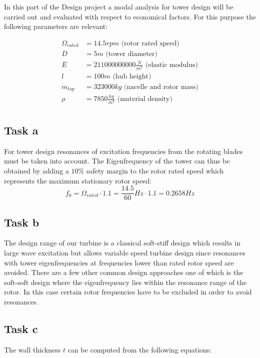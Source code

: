 \documentclass[10pt]{article}
\begin{document}
In this part of the Design project a modal analysis for tower design will be carried out and evaluated with respect to economical factors. For this purpose the following parameters are relevant:

\begin{align*}
	\Omega_{rated} &= 14.5 rpm \text{ (rotor rated speed)} \\
	D &= 5m \text{ (tower diameter)} \\
	E &=211000000000 \frac{N}{m^2} \text{ (elastic modulus)} \\
	l &=100m \text{ (hub height)} \\
	m_{top} &=323000 kg\text{ (nacelle and rotor mass)} \\
	\rho &=7850 \frac{kg}{m^3}\text{ (material density)} \\
\end{align*}

\subsection{Task a}
For tower design resonances of excitation frequencies from the rotating blades must be taken into account. The Eigenfrequency of the tower can thus be obtained by adding a $10 \%$ safety margin to the rotor rated speed which represents the maximum stationary rotor speed:
\begin{equation*}
	f_0 = \Omega_{rated} \cdot 1.1 = \frac{14.5}{60} Hz \cdot 1.1 = 0.2658 Hz
\end{equation*}

\subsection{Task b}
The design range of our turbine is a classical soft-stiff design which results in large wave excitation but allows variable speed turbine design since resonances with tower eigenfrequencies at frequencies lower than rated rotor speed are avoided. There are a few other common design approaches one of which is the soft-soft design where the eigenfrequency lies within the resonance range of the rotor. In this case certain rotor frequencies have to be excluded in order to avoid resonances.

\subsection{Task c}
The wall thickness $t$ can be computed from the following equations:
\end{document}
